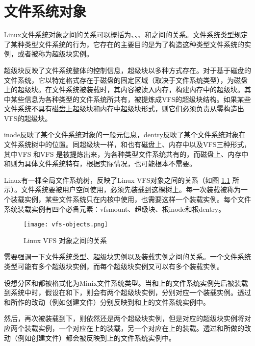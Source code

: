\chapter{文件系统对象}
\label{chapter:objects}

Linux文件系统对象之间的关系可以概括为、、、和之间的关系。文件系统类型规定了某种类型文件系统的行为，它存在的主要目的是为了构造这种类型文件系统的实例，或者被称为超级块实例。

超级块反映了文件系统整体的控制信息，超级块以多种方式存在。对于基于磁盘的文件系统，它以特定格式存在于磁盘的固定区域（取决于文件系统类型），为磁盘上的超级块。在文件系统被装载时，其内容被读入内存，构建内存中的超级块。其中某些信息为各种类型的文件系统所共有，被提炼成VFS的超级块结构。如果某些文件系统不具有磁盘上超级块和内存中超级块形式，则它们必须负责从零构造出VFS的超级块。

inode反映了某个文件系统对象的一般元信息，dentry反映了某个文件系统对象在文件系统树中的位置。同超级块一样，和也有磁盘上、内存中以及VFS三种形式，其中VFS 和VFS 是被提炼出来，为各种类型文件系统共有的，而磁盘上、内存中和则为具体文件系统特有，根据实际情况，也可能根本不需要。

Linux有一棵全局文件系统树，反映了Linux VFS对象之间的关系（如图 \ref{fig:vfs-objs} 所示）。文件系统要被用户空间使用，必须先装载到这棵树上。每一次装载被称为一个装载实例，某些文件系统只在内核中使用，也需要这样一个装载实例。每个文件系统装载实例有四个必备元素：vfsmount、超级块、根inode和根dentry。

\begin{figure}[ht]
	\centering
	\texttt{[image: vfs-objects.png]}
	\caption{Linux VFS 对象之间的关系}
	\label{fig:vfs-objs}
\end{figure}

需要强调一下文件系统类型、超级块实例以及装载实例之间的关系。一个文件系统类型可能有多个超级块实例，而每个超级块实例又可以有多个装载实例。

设想分区和都被格式化为Minix文件系统类型。当和上的文件系统实例先后被装载到系统中时，假设在和下，则会有两个超级块实例，分别对应一个装载实例。透过和所作的改动（例如创建文件）分别反映到和上的文件系统实例中。

然后，再次被装载到下，则依然还是两个超级块实例，但是对应的超级块实例将对应两个装载实例，一个对应在上的装载，另一个对应在上的装载。透过和所做的改动（例如创建文件）都会被反映到上的文件系统实例中。

